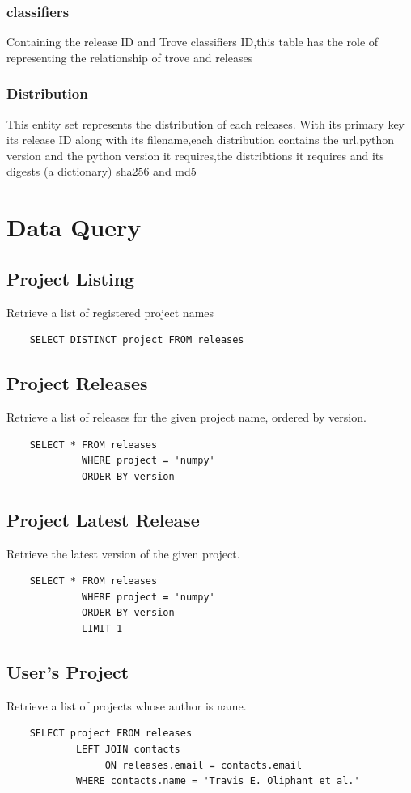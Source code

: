 \documentclass[a4paper,12pt]{article}
\begin{document}
\subsubsection{classifiers}
Containing the release ID and Trove classifiers ID,this table has the role of representing the relationship of trove and releases
\subsubsection{Distribution}
This entity set represents the distribution of each releases. With its primary key its release ID along with its filename,each distribution contains the url,python version and the python version it requires,the distribtions it requires and its digests (a dictionary) sha256 and md5


\newpage
\section{Data Query}
\subsection{Project Listing}
Retrieve a list of registered project names
\begin{verbatim}
    SELECT DISTINCT project FROM releases
\end{verbatim}
\subsection{Project Releases}
Retrieve a list of releases for the given project name, ordered by version.
\begin{verbatim}
    SELECT * FROM releases
             WHERE project = 'numpy'
             ORDER BY version
\end{verbatim}
\subsection{Project Latest Release}
Retrieve the latest version of the given project.
\begin{verbatim}
    SELECT * FROM releases
             WHERE project = 'numpy'
             ORDER BY version
             LIMIT 1
\end{verbatim}
\subsection{User's Project}
Retrieve a list of projects whose author is name.
\begin{verbatim}
    SELECT project FROM releases
            LEFT JOIN contacts
                 ON releases.email = contacts.email
            WHERE contacts.name = 'Travis E. Oliphant et al.'
\end{verbatim}
\end{document}
